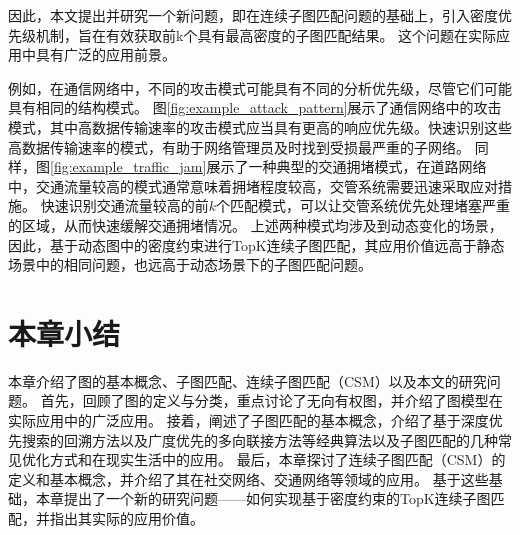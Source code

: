 因此，本文提出并研究一个新问题，即在连续子图匹配问题的基础上，引入密度优先级机制，旨在有效获取前k个具有最高密度的子图匹配结果。
这个问题在实际应用中具有广泛的应用前景。

例如，在通信网络中，不同的攻击模式可能具有不同的分析优先级，尽管它们可能具有相同的结构模式。
图\ref{fig:example_attack_pattern}展示了通信网络中的攻击模式\cite{static-topk-Gupta-DBLP:conf/icde/GuptaGYCH14}，其中高数据传输速率的攻击模式应当具有更高的响应优先级。快速识别这些高数据传输速率的模式，有助于网络管理员及时找到受损最严重的子网络。
同样，图\ref{fig:example_traffic_jam}展示了一种典型的交通拥堵模式\cite{traffic-graph-matching-DBLP:journals/pvldb/SongGCW14}，在道路网络中，交通流量较高的模式通常意味着拥堵程度较高，交管系统需要迅速采取应对措施。
快速识别交通流量较高的前$k$个匹配模式，可以让交管系统优先处理堵塞严重的区域，从而快速缓解交通拥堵情况。
上述两种模式均涉及到动态变化的场景，因此，基于动态图中的密度约束进行TopK连续子图匹配，其应用价值远高于静态场景中的相同问题，也远高于动态场景下的子图匹配问题。

\section{本章小结}
本章介绍了图的基本概念、子图匹配、连续子图匹配（CSM）以及本文的研究问题。
首先，回顾了图的定义与分类，重点讨论了无向有权图，并介绍了图模型在实际应用中的广泛应用。
接着，阐述了子图匹配的基本概念，介绍了基于深度优先搜索的回溯方法以及广度优先的多向联接方法等经典算法以及子图匹配的几种常见优化方式和在现实生活中的应用。
最后，本章探讨了连续子图匹配（CSM）的定义和基本概念，并介绍了其在社交网络、交通网络等领域的应用。
基于这些基础，本章提出了一个新的研究问题——如何实现基于密度约束的TopK连续子图匹配，并指出其实际的应用价值。